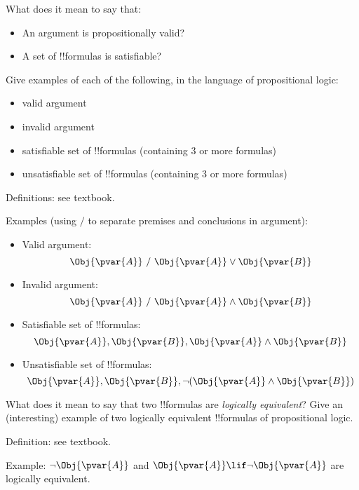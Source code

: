 \documentclass[../../../include/open-logic-section]{subfiles}
\begin{document}
\begin{prob}
    What does it mean to say that:
    \begin{itemize}
    \item An argument is propositionally valid?
    \item A set of !!{formula}s is satisfiable?
    \end{itemize}

    Give examples of each of the following, in the language of
    propositional logic:
    \begin{itemize}
    \item valid argument
    \item invalid argument
    \item satisfiable set of !!{formula}s (containing 3 or more
    formulas)
    \item unsatisfiable set of !!{formula}s (containing 3 or more
    formulas)
    \end{itemize}

    \begin{ans}Definitions: see textbook.

    Examples (using $/$ to separate premises and conclusions in argument):
    \begin{itemize}
        \item Valid argument: 
        $$\Obj{\pvar{A}} ~/~ \Obj{\pvar{A}} \lor \Obj{\pvar{B}}$$

        \item Invalid argument:
        $$\Obj{\pvar{A}} ~/~ \Obj{\pvar{A}} \land \Obj{\pvar{B}}$$

        \item Satisfiable set of !!{formula}s:
        $$\Obj{\pvar{A}}, \Obj{\pvar{B}}, 
        \Obj{\pvar{A}}\land\Obj{\pvar{B}}$$

        \item Unsatisfiable set of !!{formula}s:
        $$\Obj{\pvar{A}}, \Obj{\pvar{B}}, 
        \lnot(\Obj{\pvar{A}}\land \Obj{\pvar{B}})$$
    
    \end{itemize}
    \end{ans}
\end{prob}

\begin{prob}
    \citep[1.1 item 5]{MacFarlane-2020-PhilosophicalLogicContemporary}
    What does it mean to say that two !!{formula}s are \emph{logically equivalent}?
    Give an (interesting) example of two logically equivalent !!{formula}s of
    propositional logic.    

    \begin{ans}Definition: see textbook.

    Example: $\lnot\Obj{\pvar{A}}$ and 
    $\Obj{\pvar{A}}\lif\lnot\Obj{\pvar{A}}$ are logically equivalent.
    \end{ans}
\end{prob}

    
    
\end{document}
